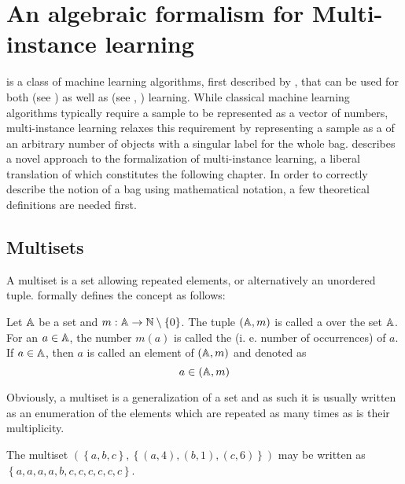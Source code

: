 \chapter{An algebraic formalism for Multi-instance learning}

 is a class of machine learning algorithms, first described by \cite{dietterich_solving_1997}, that can be used for both  (see \cite{amores_multiple_2013}) as well as  (see \cite{zhang_multi-instance_2009}, \cite{chen_contextual_2012}) learning. While classical machine learning algorithms typically require a sample to be represented as a vector of numbers, multi-instance learning relaxes this requirement by representing a sample as a  of an arbitrary number of objects with a singular label for the whole bag. \cite{dedic_hierarchicke_2017} describes a novel approach to the formalization of multi-instance learning, a liberal translation of which constitutes the following chapter.
In order to correctly describe the notion of a bag using mathematical notation, a few theoretical definitions are needed first.

\section{Multisets}

A multiset is a set allowing repeated elements, or alternatively an unordered tuple. \cite{knuth_art_1968} formally defines the concept as follows:

\begin{define}
	Let \( \mathbb{A} \) be a set and \( m : \mathbb{A} \to \mathbb{N} \setminus \left\{ 0 \right\} \). The tuple \( \left( \mathbb{A}, m \right) \) is called a  over the set \( \mathbb{A} \). For an \( a \in \mathbb{A} \), the number \( m \left( a \right) \) is called the  (i. e. number of occurrences) of \( a \). If \( a \in \mathbb{A} \), then \( a \) is called an element of \( \left( \mathbb{A}, m \right) \) and denoted as
	\[ a \in \left( \mathbb{A}, m \right) \]
\end{define}

Obviously, a multiset is a generalization of a set and as such it is usually written as an enumeration of the elements which are repeated as many times as is their multiplicity.

\begin{example}
	The multiset \( \left( \left\{ a, b, c \right\}, \left\{ \left( a, 4 \right), \left( b, 1 \right), \left( c, 6 \right) \right\} \right) \) may be written as \( \left\{ a, a, a, a, b, c, c, c, c, c, c \right\} \).
\end{example}

